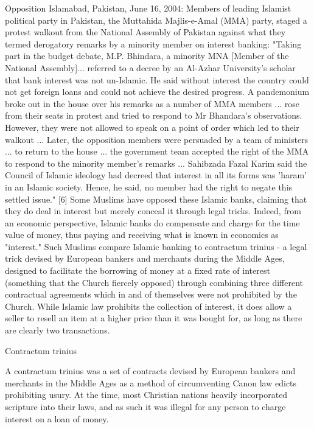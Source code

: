 Opposition
Islamabad, Pakistan, June 16, 2004: Members of leading Islamist political party in Pakistan, the Muttahida Majlis-e-Amal (MMA) party, staged a protest walkout from the National Assembly of Pakistan against what they termed derogatory remarks by a minority member on interest banking: "Taking part in the budget debate, M.P. Bhindara, a minority MNA [Member of the National Assembly]... referred to a decree by an Al-Azhar University's scholar that bank interest was not un-Islamic. He said without interest the country could not get foreign loans and could not achieve the desired progress. A pandemonium broke out in the house over his remarks as a number of MMA members ... rose from their seats in protest and tried to respond to Mr Bhandara's observations. However, they were not allowed to speak on a point of order which led to their walkout ... Later, the opposition members were persuaded by a team of ministers ... to return to the house ... the government team accepted the right of the MMA to respond to the minority member's remarks ... Sahibzada Fazal Karim said the Council of Islamic ideology had decreed that interest in all its forms was 'haram' in an Islamic society. Hence, he said, no member had the right to negate this settled issue." [6] 
Some Muslims have opposed these Islamic banks, claiming that they do deal in interest but merely conceal it through legal tricks. Indeed, from an economic perspective, Islamic banks do compensate and charge for the time value of money, thus paying and receiving what is known in economics as "interest." Such Muslims compare Islamic banking to contractum trinius - a legal trick devised by European bankers and merchants during the Middle Ages, designed to facilitate the borrowing of money at a fixed rate of interest (something that the Church fiercely opposed) through combining three different contractual agreements which in and of themselves were not prohibited by the Church. While Islamic law prohibits the collection of interest, it does allow a seller to resell an item at a higher price than it was bought for, as long as there are clearly two transactions. 

Contractum trinius

A contractum trinius was a set of contracts devised by European bankers and merchants in the Middle Ages as a method of circumventing Canon law edicts prohibiting usury. At the time, most Christian nations heavily incorporated scripture into their laws, and as such it was illegal for any person to charge interest on a loan of money.

